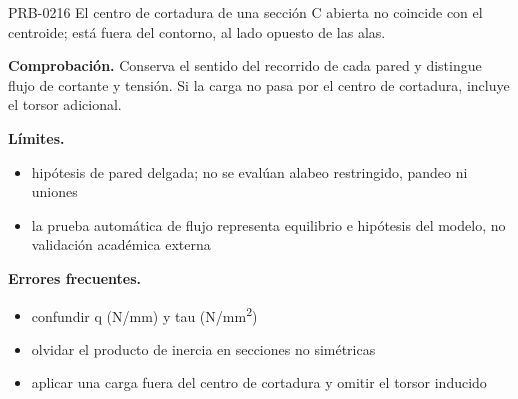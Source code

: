 \begin{studiumworked}{PRB-0216}
El centro de cortadura de una sección C abierta no coincide con el centroide; está fuera del contorno, al lado opuesto de las alas.

\par\textbf{Comprobación.} Conserva el sentido del recorrido de cada pared y distingue flujo de cortante y tensión. Si la carga no pasa por el centro de cortadura, incluye el torsor adicional.

\textbf{Límites.}\begin{itemize}\item hipótesis de pared delgada; no se evalúan alabeo restringido, pandeo ni uniones
\item la prueba automática de flujo representa equilibrio e hipótesis del modelo, no validación académica externa\end{itemize}

\textbf{Errores frecuentes.}\begin{itemize}\item confundir q (N/mm) y tau (N/mm\textsuperscript{2})
\item olvidar el producto de inercia en secciones no simétricas
\item aplicar una carga fuera del centro de cortadura y omitir el torsor inducido\end{itemize}

\end{studiumworked}

\Needspace{.3\textheight}

